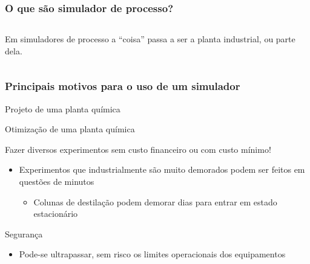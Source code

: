 \documentclass[aspectratio=169]{beamer}
\begin{document}
\begin{frame}
	\frametitle{O que são simulador de processo?}
	\begin{columns}[t] 
		Em simuladores de processo a ``coisa'' passa a ser a planta industrial, ou
		parte dela.
	\end{columns}
\end{frame}

\begin{frame}
	\frametitle{Principais motivos para o uso de um simulador}
	Projeto de uma planta química\\

	Otimização de uma planta química\\
	
	Fazer diversos experimentos sem custo financeiro ou com custo mínimo!
	\begin{itemize}
		\item Experimentos que industrialmente são muito demorados podem ser feitos em
		questões de minutos
			\begin{itemize}
				\item Colunas de destilação podem demorar dias para entrar
				em estado estacionário
		\end{itemize}
	\end{itemize}
	Segurança
	\begin{itemize}
		\item Pode-se ultrapassar, sem risco os limites operacionais dos equipamentos
	\end{itemize}
\end{frame}
\end{document}
